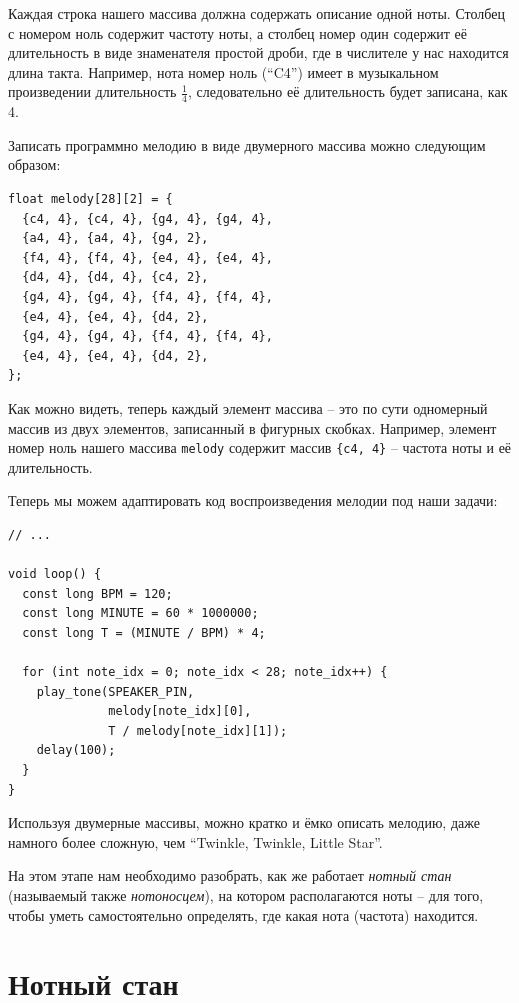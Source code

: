 \documentclass[a4paper,twoside]{book}
\begin{document}
Каждая строка нашего массива должна содержать описание одной ноты. Столбец с
номером ноль содержит частоту ноты, а столбец номер один содержит её
длительность в виде знаменателя простой дроби, где в числителе у нас находится
длина такта. Например, нота номер ноль (``C4'') имеет в музыкальном произведении
длительность $\frac{1}{4}$, следовательно её длительность будет записана, как 4.

Записать программно мелодию в виде двумерного массива можно следующим образом:

\begin{verbatim}
float melody[28][2] = {
  {c4, 4}, {c4, 4}, {g4, 4}, {g4, 4},
  {a4, 4}, {a4, 4}, {g4, 2},
  {f4, 4}, {f4, 4}, {e4, 4}, {e4, 4},
  {d4, 4}, {d4, 4}, {c4, 2},
  {g4, 4}, {g4, 4}, {f4, 4}, {f4, 4},
  {e4, 4}, {e4, 4}, {d4, 2},
  {g4, 4}, {g4, 4}, {f4, 4}, {f4, 4},
  {e4, 4}, {e4, 4}, {d4, 2},
};
\end{verbatim}

Как можно видеть, теперь каждый элемент массива -- это по сути одномерный массив
из двух элементов, записанный в фигурных скобках. Например, элемент номер ноль
нашего массива \texttt{melody} содержит массив \texttt{\{c4, 4\}} -- частота ноты
и её длительность.

Теперь мы можем адаптировать код воспроизведения мелодии под наши задачи:

\begin{verbatim}
// ...

void loop() {
  const long BPM = 120;
  const long MINUTE = 60 * 1000000;
  const long T = (MINUTE / BPM) * 4;

  for (int note_idx = 0; note_idx < 28; note_idx++) {
    play_tone(SPEAKER_PIN,
              melody[note_idx][0],
              T / melody[note_idx][1]);
    delay(100);
  }
}
\end{verbatim}

Используя двумерные массивы, можно кратко и ёмко описать мелодию, даже намного
более сложную, чем ``Twinkle, Twinkle, Little Star''.

На этом этапе нам необходимо разобрать, как же работает \emph{нотный стан}
(называемый также \emph{нотоносцем}), на котором располагаются ноты -- для того,
чтобы уметь самостоятельно определять, где какая нота (частота) находится.

\section{Нотный стан}
\end{document}
